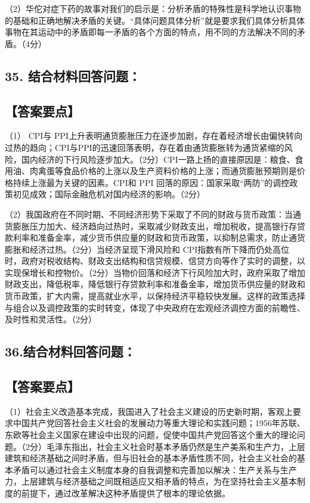 \documentclass[UTF8,11pt]{ctexart}
\begin{document}
（2）华佗对症下药的故事对我们的启示是：分析矛盾的特殊性是科学地认识事物的基础和正确地解决矛盾的关键。“具体问题具体分析”就是要求我们具体分析具体事物在其运动中的矛盾即每一矛盾的各个方面的特点，用不同的方法解决不同的矛盾。（4分）


\subsection*{35. 结合材料回答问题：}

\subsection*{【答案要点】}

（1） CPI与 PPI上升表明通货膨胀压力在逐步加剧，存在着经济增长由偏快转向过热的趋向；CPI与PPI的迅速回落表明，存在着由通货膨胀转为通货紧缩的风险，国内经济的下行风险逐步加大。（2分）CPI一路上扬的直接原因是：粮食、食用油、肉禽蛋等食品价格的上涨以及生产资料价格的上涨；而通货膨胀预期则是价格持续上涨最为关键的因素。CPI和 PPI 回落的原因：国家采取“两防”的调控政策初见成效；国际金融危机对国内经济的影响。（2分）


（2）我国政府在不同时期、不同经济形势下采取了不同的财政与货币政策：当通货膨胀压力加大、经济趋向过热时，采取减少财政支出，增加税收，提高银行存贷款利率和准备金率，减少货币供应量的财政和货币政策，以抑制总需求，防止通货膨胀和经济过热。（2分）当经济呈现下滑风险和 CPI指数有所下降而仍处高位时，政府对税收结构、财政支出结构和信贷规模、信贷方向等作了实时的调整，以实现保增长和控物价。（2分）当物价回落和经济下行风险加大时，政府采取了增加财政支出，降低税率，降低银行存贷款利率和准备金率，增加货币供应量的财政和货币政策，扩大内需，提高就业水平，以保持经济平稳较快发展。这样的政策选择与组合以及调控政策的实时转变，体现了中央政府在宏观经济调控方面的前瞻性、及时性和灵活性。（2分）


\subsection*{36.结合材料回答问题：}

\subsection*{【答案要点】}

（1）社会主义改造基本完成，我国进入了社会主义建设的历史新时期，客观上要求中国共产党回答社会主义社会的发展动力等重大理论和实践问题；1956年苏联、东欧等社会主义国家在建设中出现的问题，促使中国共产党回答这个重大的理论问题。（2分）毛泽东指出，社会主义社会时基本矛盾仍然是生产美系和生产力，上层建筑和经济基础之间时矛盾，但与旧社会的基本矛盾性质不同，社会主义社会的基本矛盾可以通过社会主义制度本身的自我调整和完善加以解决：生产关系与生产力，上层建筑与经济基础之间既相适应又相矛盾的特点，为在坚持社会主义基本制度的前提下，通过改革解决这种矛盾提供了根本的理论依据。
\end{document}
